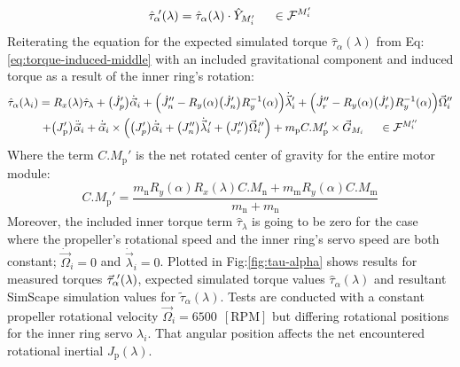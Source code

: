 \begin{equation}
\hat{\tau}_\alpha\text{}\hspace{-2pt}'(\lambda)=\hat{\tau}_\alpha(\lambda)\cdot\hat{Y}_{M_i'}~~~~\in\mathcal{F}^{M_i'}
\end{equation}
Reiterating the equation for the expected simulated torque $\hat{\tau}_\alpha(\lambda)$ from Eq:\ref{eq:torque-induced-middle} with an included gravitational component and induced torque as a result of the inner ring's rotation:
\begin{multline} \label{eq:model-middle}
\hat{\tau}_\alpha(\lambda_i)=R_x(\lambda)\hat{\tau}_\lambda+\big(\dot{J}_p'\big)\dot{\vec{\alpha}}_i+\Big(\dot{J}_n''-R_y(\alpha)\big(\dot{J}_n'\big)R_y^{-1}(\alpha)\Big)\dot{\vec{\lambda}}_i'+\Big(\dot{J}_r''-R_y(\alpha)\big(\dot{J}_r'\big)R_y^{-1}(\alpha)\Big)\vec{\Omega}_i''
\\
+\big(J_\text{p}'\big)\ddot{\vec{\alpha}}_i+\dot{\vec{\alpha}}_i\times \Big(\big(J_p'\big)\dot{\vec{\alpha}}_i+\big(J_n''\big)\dot{\vec{\lambda}}_i\hspace{-2pt}'+\big(J_r''\big)\vec{\Omega}_i\hspace{-2pt}''\Big)+m_\text{p}C.M'_{\text{p}}\times\vec{G}_{M_i}~~~~\in\mathcal{F}^{M_i''}
\end{multline}
Where the term $C.M_{\text{p}}'$ is the net rotated center of gravity for the entire motor module:
\begin{equation}
C.M_\text{p}'=\frac{m_\text{n}R_y(\alpha)R_x(\lambda)C.M_\text{n}+m_\text{m}R_y(\alpha)C.M_\text{m}}{m_\text{n}+m_\text{n}}
\end{equation}
Moreover, the included inner torque term $\hat{\tau}_\lambda$ is going to be zero for the case where the propeller's rotational speed and the inner ring's servo speed are both constant; $\dot{\vec{\Omega}}_i=0$ and $\dot{\vec{\lambda}}_i=0$. Plotted in Fig:\ref{fig:tau-alpha} shows results for measured torques $\vec{\tau}_\alpha\text{}\hspace{-2pt}'(\lambda)$, expected simulated torque values $\hat{\tau}_\alpha(\lambda)$ and resultant SimScape simulation values for $\tilde{\tau}_\alpha(\lambda)$. Tests are conducted with a constant propeller rotational velocity $\vec{\Omega}_i=6500~~[\text{RPM}]$ but differing rotational positions for the inner ring servo $\lambda_i$. That angular position affects the net encountered rotational inertial $J_\text{p}(\lambda)$.
